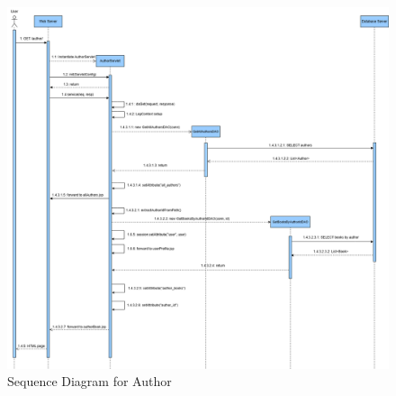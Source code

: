 \clearpage
\begin{figure}[h!]
    \centering
    \includegraphics[width=\textwidth]{photos/Sequence_Diagram_for_AuthorServlet.png}
    \caption{Sequence Diagram for Author}
    \label{fig:authorservletsequencediagram}
\end{figure}